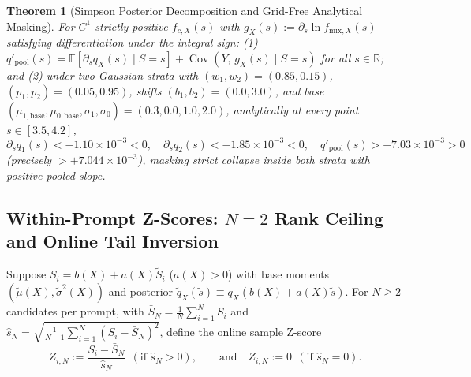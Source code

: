 \documentclass{article}
\theoremstyle{plain}
\newtheorem{theorem}{Theorem}
\theoremstyle{definition}
\theoremstyle{remark}
\newcommand{\R}{\mathbb{R}}
\newcommand{\E}{\mathbb{E}}
\newcommand{\Cov}{\operatorname{Cov}}
\begin{document}
\begin{theorem}[Simpson Posterior Decomposition and Grid-Free Analytical Masking]
\label{thm:simpson}
For $C^1$ strictly positive $f_{c, X}(s)$ with $g_X(s) := \partial_s \ln f_{\mathrm{mix}, X}(s)$ satisfying differentiation under the integral sign: (1) $q'_{\mathrm{pool}}(s) = \E[\partial_s q_X(s) \mid S = s] + \Cov(Y,\, g_X(s) \mid S = s)$ for all $s \in \R$; and (2) under two Gaussian strata with $(w_1, w_2) = (0.85, 0.15)$, $(p_1, p_2) = (0.05, 0.95)$, shifts $(b_1, b_2) = (0.0, 3.0)$, and base $(\mu_{1,\mathrm{base}}, \mu_{0,\mathrm{base}}, \sigma_1, \sigma_0) = (0.3, 0.0, 1.0, 2.0)$, analytically at every point $s \in [3.5, 4.2]$,
\begin{equation}
\partial_s q_1(s) < -1.10\times 10^{-3} < 0, \quad \partial_s q_2(s) < -1.85\times 10^{-3} < 0, \quad q'_{\mathrm{pool}}(s) > +7.03\times 10^{-3} > 0
\end{equation}
(precisely $> +7.044\times 10^{-3}$), masking strict collapse inside both strata with positive pooled slope.
\end{theorem}

\subsection{Within-Prompt Z-Scores: \texorpdfstring{$N=2$}{N=2} Rank Ceiling and Online Tail Inversion}

Suppose $S_i = b(X) + a(X)\tilde{S}_i$ ($a(X) > 0$) with base moments $(\tilde{\mu}(X), \tilde{\sigma}^2(X))$ and posterior $\tilde{q}_X(\tilde{s}) \equiv q_X(b(X) + a(X)\tilde{s})$. For $N \ge 2$ candidates per prompt, with $\bar{S}_N = \frac{1}{N}\sum_{i=1}^N S_i$ and $\hat{s}_N = \sqrt{\frac{1}{N-1}\sum_{i=1}^N(S_i - \bar{S}_N)^2}$, define the online sample Z-score
\begin{equation}
\label{eq:sample-z}
Z_{i, N} := \frac{S_i - \bar{S}_N}{\hat{s}_N} \ \ (\text{if }\hat{s}_N > 0), \qquad \text{and}\quad Z_{i,N} := 0 \ \ (\text{if }\hat{s}_N = 0).
\end{equation}
\end{document}

